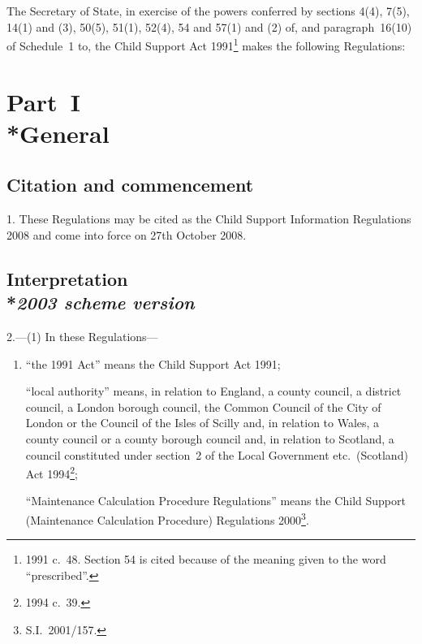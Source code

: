 \documentclass[12pt,a4paper]{article}
\title{\regstitle}
\author{S.I.\ 2008 No.\ 2551}
\date{Made
26th September 2008\\
Laid before Parliament
2nd October 2008\\
Coming into force
27th October 2008
}
\begin{document}
\maketitle

\noindent
The Secretary of State, in exercise of the powers conferred by sections 4(4), 7(5), 14(1) and (3), 50(5), 51(1), 52(4), 54 and 57(1) and (2) of, and paragraph~16(10) of Schedule~1 to, the Child Support Act 1991\footnote{1991 c.~48. Section 54 is cited because of the meaning given to the word “prescribed”.} makes the following Regulations: 

{\sloppy

\tableofcontents

}

\bigskip

\setcounter{secnumdepth}{-2}

\section[Part~I --- General]{Part~I\\*General}

\renewcommand\parthead{--- Part~I}

\subsection[1. Citation and commencement]{Citation and commencement}

1.  These Regulations may be cited as the Child Support Information Regulations 2008 and come into force on 27th October 2008.

\subsection[2. Interpretation --- \emph{2003 scheme version}]{Interpretation\\*\emph{2003 scheme version}}

2.---(1)  In these Regulations—
\begin{enumerate}\item[]
“the 1991 Act” means the Child Support Act 1991;

“local authority” means, in relation to England, a county council, a district council, a London borough council, the Common Council of the City of London or the Council of the Isles of Scilly and, in relation to Wales, a county council or a county borough council and, in relation to Scotland, a council constituted under section~2 of the Local Government etc.\ (Scotland) Act 1994\footnote{1994 c.~39.};

“Maintenance Calculation Procedure Regulations” means the Child Support (Maintenance Calculation Procedure) Regulations 2000\footnote{S.I.~2001/157.}.
\end{enumerate}
\end{document}

